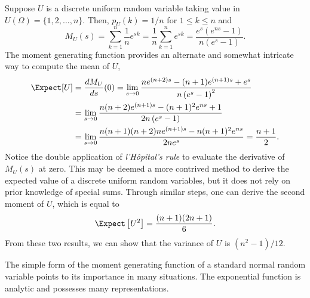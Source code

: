 \begin{example}
Suppose $U$ is a discrete uniform random variable taking value in $U(\Omega) = \{ 1, 2, \ldots, n \}$.
Then, $p_U(k) = 1/n$ for $1 \leq k \leq n$ and
\begin{equation*}
M_U(s) = \sum_{k = 1}^n \frac{1}{n} e^{sk}
= \frac{1}{n} \sum_{k = 1}^n e^{sk}
= \frac {e^s (e^{ns} - 1)} {n (e^s - 1)} .
\end{equation*}
The moment generating function provides an alternate and somewhat intricate way to compute the mean of $U$,
\begin{equation*}
\begin{split}
\Expect [U] &= \frac{d M_U}{ds} (0)
= \lim_{s \rightarrow 0}
\frac{n e^{(n+2)s} - (n+1) e^{(n+1)s} + e^s}{n \left( e^s - 1 \right)^2} \\
&= \lim_{s \rightarrow 0}
\frac{n(n+2) e^{(n+1)s} - (n+1)^2 e^{ns} + 1}{2n \left( e^s - 1 \right)} \\
&= \lim_{s \rightarrow 0}
\frac{n(n+1)(n+2)n e^{(n+1)s} - n (n+1)^2 e^{ns}}{2n e^s}
= \frac {n + 1}{2} .
\end{split}
\end{equation*}
Notice the double application of \emph{l'H\^{o}pital's rule} to evaluate the derivative of $M_U(s)$ at zero.
This may be deemed a more contrived method to derive the expected value of a discrete uniform random variables, but it does not rely on prior knowledge of special sums.
Through similar steps, one can derive the second moment of $U$, which is equal to
\begin{equation*}
\Expect \left[ U^2 \right] = \frac{(n+1)(2n+1)}{6} .
\end{equation*}
From these two results, we can show that the variance of $U$ is $(n^2 - 1)/12$.
\end{example}

The simple form of the moment generating function of a standard normal random variable points to its importance in many situations.
The exponential function is analytic and possesses many representations.


